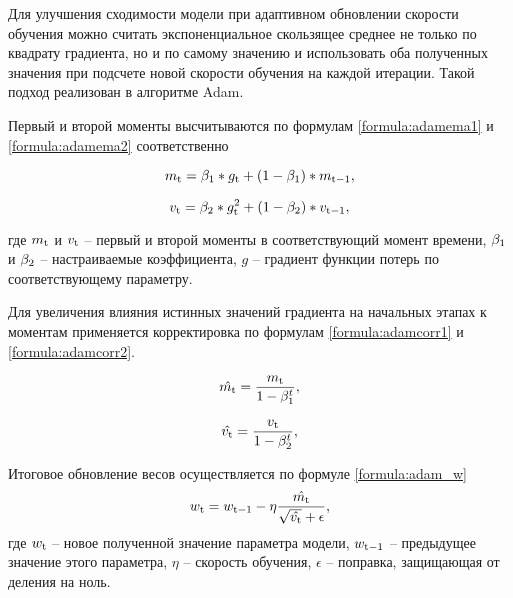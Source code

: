 Для улучшения сходимости модели при адаптивном обновлении скорости обучения можно считать экспоненциальное скользящее среднее не только по квадрату градиента, но и по самому значению и использовать оба полученных значения при подсчете новой скорости обучения на каждой итерации. 
Такой подход реализован в алгоритме Adam.

Первый и второй моменты высчитываются по формулам \ref{formula:adamema1} и \ref{formula:adamema2} соответственно

\begin{equation}\label{formula:adamema1}
	m_{\rm{t}} = \beta_{\rm{1}} * g_{\rm{t}} + (1 - \beta_{\rm{1}}) * m_{\rm{t-1}},
\end{equation}

\begin{equation}\label{formula:adamema2}
	v_{\rm{t}} = \beta_{\rm{2}} * g_{\rm{t}}^2 + (1 - \beta_{\rm{2}}) * v_{\rm{t-1}},
\end{equation}

где $m_{\rm{t}}$ и $v_{\rm{t}}$ -- первый и второй моменты в соответствующий момент времени, $\beta_{\rm{1}}$ и $\beta_{\rm{2}}$ -- настраиваемые коэффициента, $g$ -- градиент функции потерь по соответствующему параметру.

Для увеличения влияния истинных значений градиента на начальных этапах к моментам применяется корректировка по формулам \ref{formula:adamcorr1} и \ref{formula:adamcorr2}.

\begin{equation}\label{formula:adamcorr1}
	\hat{m_{\rm{t}}} = \frac{m_{\rm{t}}}{1 - \beta_{\rm{1}}^t},
\end{equation}

\begin{equation}\label{formula:adamcorr2}
	\hat{v_{\rm{t}}} = \frac{v_{\rm{t}}}{1 - \beta_{\rm{2}}^t},
\end{equation}

Итоговое обновление весов осуществляется по формуле 
\ref{formula:adam_w}
\begin{equation}\label{formula:adam_w}
	w_{\rm{t}} = w_{\rm{t-1}} - \eta\frac{\hat{m_{\rm{t}}}}{\sqrt{\hat{v_{\rm{t}}}} + \epsilon},
\end{equation}
где $w_{\rm{t}}$ -- новое полученной значение параметра модели, $w_{\rm{t-1}}$ -- предыдущее значение этого параметра, $\eta$ -- скорость обучения, $\epsilon$ -- поправка, защищающая от деления на ноль.


